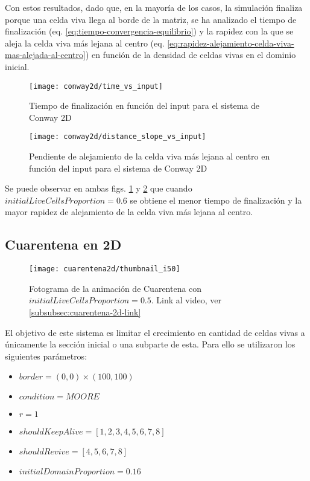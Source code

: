 Con estos resultados, dado que, en la mayoría de los casos, la simulación finaliza porque una celda viva llega al borde de la matriz,
se ha analizado el tiempo de finalización (eq. \ref{eq:tiempo-convergencia-equilibrio}) y la rapidez con la que se aleja la celda viva
más lejana al centro (eq. \ref{eq:rapidez-alejamiento-celda-viva-mas-alejada-al-centro}) en función de la densidad de celdas vivas en el dominio inicial.

\begin{figure}[H]
    \centering
    \texttt{[image: conway2d/time\_vs\_input]}
    \caption{Tiempo de finalización en función del input para el sistema de Conway 2D}
    \label{fig:conway2d_time_vs_input}
\end{figure}
\begin{figure}[H]
    \centering
    \texttt{[image: conway2d/distance\_slope\_vs\_input]}
    \caption{Pendiente de alejamiento de la celda viva más lejana al centro en función del input para el sistema de Conway 2D}
    \label{fig:conway2d_distance_slope_vs_input}
\end{figure}

Se puede observar en ambas figs. \ref{fig:conway2d_time_vs_input} y \ref{fig:conway2d_distance_slope_vs_input} que cuando
$initialLiveCellsProportion = 0.6$ se obtiene el menor tiempo de finalización y la mayor rapidez de alejamiento de la celda viva más lejana al centro.

\subsection{Cuarentena en 2D}\label{subsec:cuarentena-2D}

\begin{figure}[H]
    \centering
    \texttt{[image: cuarentena2d/thumbnail\_i50]}
    \caption{Fotograma de la animación de Cuarentena con $initialLiveCellsProportion = 0.5$. Link al video, ver \ref{subsubsec:cuarentena-2d-link}}
    \label{fig:thumbnailcuarentena2d_i50}
\end{figure}

El objetivo de este sistema es limitar el crecimiento en cantidad de celdas vivas a únicamente la sección inicial o una subparte de esta. Para ello
se utilizaron los siguientes parámetros:

\begin{itemize}
    \item $border = (0, 0) \times (100, 100)$
    \item $condition = MOORE$
    \item $r = 1$
    \item $shouldKeepAlive = [1, 2, 3, 4, 5, 6, 7, 8]$
    \item $shouldRevive = [4, 5, 6, 7, 8]$
    \item $initialDomainProportion = 0.16$
\end{itemize}

